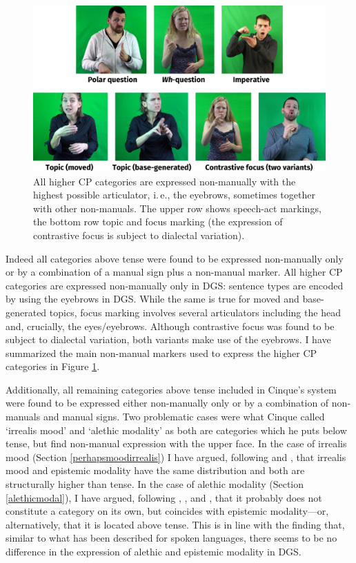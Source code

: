 \begin{figure}[bt]
\centering
	\includegraphics[width=1.0\textwidth]{uebersicht.jpg}
	\caption{All higher CP categories are expressed non-manually with the highest possible articulator, i.\,e., the eyebrows, sometimes together with other non-manuals. The upper row shows speech-act markings, the bottom row topic and focus marking (the expression of contrastive focus is subject to dialectal variation).}
	\label{highercpcategories}
\end{figure}

Indeed all categories above tense were found to be expressed non-manually only or by a combination of a manual sign plus a non-manual marker. All higher CP categories are expressed non-manually only in DGS: sentence types are encoded by using the eyebrows in DGS. While the same is true for moved and base-generated topics, focus marking involves several articulators including the head and, crucially, the eyes/eyebrows. Although contrastive focus was found to be subject to dialectal variation, both variants make use of the eyebrows. I have summarized the main non-manual markers used to express the higher CP categories in Figure \ref{highercpcategories}.

Additionally, all remaining categories above tense included in Cinque's system were found to be expressed either non-manually only or by a combination of non-manuals and manual signs. Two problematic cases were what Cinque called `irrealis mood' and `alethic modality' as both are categories which he puts below tense, but find non-manual expression with the upper face. In the case of irrealis mood (Section \ref{perhapsmoodirrealis}) I have argued, following \citet{nordstrom2010modality} and \citet{zyman2012two}, that irrealis mood and epistemic modality have the same distribution and both are structurally higher than tense. In the case of alethic modality (Section \ref{alethicmodal}), I have argued, following \citet{palmer1986mood}, \citet{nuyts2000epistemic}, and \citet{von2006modality}, that it probably does not constitute a category on its own, but coincides with epistemic modality---or, alternatively, that it is located above tense. This is in line with the finding that, similar to what has been described for spoken languages, there seems to be no difference in the expression of alethic and epistemic modality in DGS.

